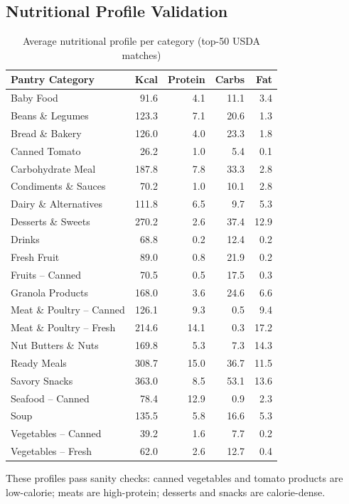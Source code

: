 \documentclass[11pt]{article}
\begin{document}
\subsection{Nutritional Profile Validation}

\begin{table}[h]
\centering
\caption{Average nutritional profile per category (top-50 USDA matches)}
\label{tab:nutrition}
\small
\begin{tabular}{lrrrr}
\toprule
Pantry Category & Kcal & Protein & Carbs & Fat \\
\midrule
Baby Food & 91.6 & 4.1 & 11.1 & 3.4 \\
Beans \& Legumes & 123.3 & 7.1 & 20.6 & 1.3 \\
Bread \& Bakery & 126.0 & 4.0 & 23.3 & 1.8 \\
Canned Tomato & 26.2 & 1.0 & 5.4 & 0.1 \\
Carbohydrate Meal & 187.8 & 7.8 & 33.3 & 2.8 \\
Condiments \& Sauces & 70.2 & 1.0 & 10.1 & 2.8 \\
Dairy \& Alternatives & 111.8 & 6.5 & 9.7 & 5.3 \\
Desserts \& Sweets & 270.2 & 2.6 & 37.4 & 12.9 \\
Drinks & 68.8 & 0.2 & 12.4 & 0.2 \\
Fresh Fruit & 89.0 & 0.8 & 21.9 & 0.2 \\
Fruits -- Canned & 70.5 & 0.5 & 17.5 & 0.3 \\
Granola Products & 168.0 & 3.6 & 24.6 & 6.6 \\
Meat \& Poultry -- Canned & 126.1 & 9.3 & 0.5 & 9.4 \\
Meat \& Poultry -- Fresh & 214.6 & 14.1 & 0.3 & 17.2 \\
Nut Butters \& Nuts & 169.8 & 5.3 & 7.3 & 14.3 \\
Ready Meals & 308.7 & 15.0 & 36.7 & 11.5 \\
Savory Snacks & 363.0 & 8.5 & 53.1 & 13.6 \\
Seafood -- Canned & 78.4 & 12.9 & 0.9 & 2.3 \\
Soup & 135.5 & 5.8 & 16.6 & 5.3 \\
Vegetables -- Canned & 39.2 & 1.6 & 7.7 & 0.2 \\
Vegetables -- Fresh & 62.0 & 2.6 & 12.7 & 0.4 \\
\bottomrule
\end{tabular}
\end{table}

These profiles pass sanity checks: canned vegetables and tomato products are low-calorie; meats are high-protein; desserts and snacks are calorie-dense.
\end{document}
